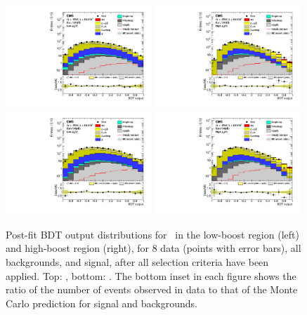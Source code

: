 \documentclass[12pt,twoside,a4paper,cmspaper,final,collab]{cms-tdr}
\begin{document}
\begin{figure}[htbp]
\centering
    \includegraphics[width=0.49\textwidth]{BDT_Zll_ZmmLowPt_PostFit_s.pdf}
    \includegraphics[width=0.49\textwidth]{BDT_Zll_ZmmHighPt_PostFit_s.pdf}
   \includegraphics[width=0.49\textwidth]{BDT_Zll_ZeeLowPt_PostFit_s.pdf}
    \includegraphics[width=0.49\textwidth]{BDT_Zll_ZeeHighPt_PostFit_s.pdf}
    \caption{Post-fit BDT output distributions for \ZllH\ in the
    low-boost region (left) and high-boost region (right), for 8\TeV
    data (points with error bars),
    all backgrounds, and signal, after all selection criteria have been
    applied. Top: \ZmmH, bottom: \ZeeH. The bottom inset in each
      figure shows the ratio of the number of events observed in data to that
      of the Monte Carlo prediction for signal and backgrounds.}
    \label{fig:BDTZmm8TeV}
\end{figure}
\end{document}
